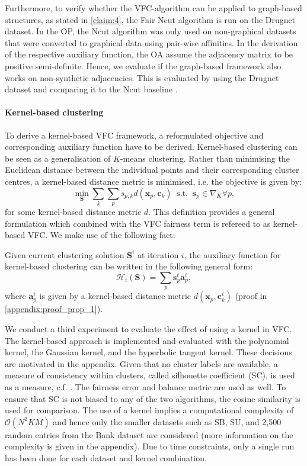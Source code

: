 Furthermore, to verify whether the VFC-algorithm can be applied to graph-based structures, as stated in \ref{claim:4}, the Fair Ncut algorithm is run on the Drugnet dataset. In the OP, the Ncut algorithm was only used on non-graphical datasets that were converted to graphical data using pair-wise affinities. In the derivation of the respective auxiliary function, the OA assume the adjacency matrix to be positive semi-definite. Hence, we evaluate if the graph-based framework also works on non-synthetic adjacencies. This is evaluated by using the Drugnet dataset and comparing it to the Ncut baseline \cite{kleindessner2019guarantees}.


\paragraph{Kernel-based clustering} \label{par:kbc} 
To derive a kernel-based VFC framework, a reformulated objective and corresponding auxiliary function have to be derived. Kernel-based clustering can be seen as a generalisation of $K$-means clustering. Rather than minimising the Euclidean distance between the individual points and their corresponding cluster centres, a kernel-based distance metric is minimised, i.e. the objective is given by:
\begin{equation}
	\label{eq:KBC_objective}
	\min_{\mathbf{S}} \sum_k \sum_p s_{p, k} d(\textbf{x}_p, \textbf{c}_k) ~\text{ s.t. }~ \textbf{s}_p \in \nabla_K \forall p,
\end{equation}
for some kernel-based distance metric $d$. This definition provides a general formulation which combined with the VFC fairness term is refereed to as kernel-based VFC. We make use of the following fact:
\begin{prop}\label{prop:kernel}
	Given current clustering solution $\mathbf{S}^i$ at iteration $i$, the auxiliary function for kernel-based clustering can be written in the following general form:
	$$\mathcal{H}_i(\mathbf{S}) = \sum_p \textbf{s}_p^t  \textbf{a}_p^i,$$
	where $\bm{a}_p^i$ is given by a kernel-based distance metric $d(\bm{x}_p, \bm{c}_k^i)$ (proof in \autoref{appendix:proof_prop_1}).
\end{prop}
We conduct a third experiment to evaluate the effect of using a kernel in VFC. The kernel-based approach is implemented and evaluated with the polynomial kernel, the Gaussian kernel, and the hyperbolic tangent kernel. These decisions are motivated in the appendix.
Given that no cluster labels are available, a measure of consistency within clusters, called silhouette coefficient (SC), is used as a measure, c.f. \cite{dinh2019estimating}. The fairness error and balance metric are used as well. To ensure that SC is not biased to any of the two algorithms, the cosine similarity is used for comparison. The use of a kernel implies a computational complexity of $\mathcal{O}(N^2KM)$ and hence only the smaller datasets such as SB, SU, and 2,500 random entries from the Bank dataset are considered (more information on the complexity is given in the appendix). Due to time constraints, only a single run has been done for each dataset and kernel combination. 

